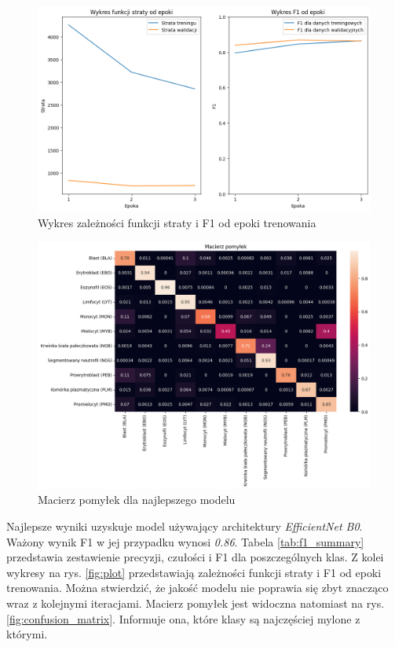 \begin{figure}
    \centering
    \includegraphics[width=\textwidth]{experiments/efficientnet_b0/combined}
    \caption{Wykres zależności funkcji straty i F1 od epoki trenowania}
\end{figure}

\begin{figure}
    \centering
    \includegraphics[width=\textwidth]{experiments/efficientnet_b0/confusion_matrix}
    \caption{Macierz pomyłek dla najlepszego modelu}
\end{figure}



Najlepsze wyniki uzyskuje model używający architektury \textit{EfficientNet B0}. Ważony wynik F1 w jej przypadku wynosi \textit{0.86}.
Tabela \ref{tab:f1_summary} przedstawia zestawienie precyzji, czułości i F1 dla poszczególnych klas.
Z kolei wykresy na rys. \ref{fig:plot} przedstawiają zależności funkcji straty i F1 od epoki trenowania.
Można stwierdzić, że jakość modelu nie poprawia się zbyt znacząco wraz z kolejnymi iteracjami.
Macierz pomyłek jest widoczna natomiast na rys. \ref{fig:confusion_matrix}.
Informuje ona, które klasy są najczęściej mylone z którymi.

